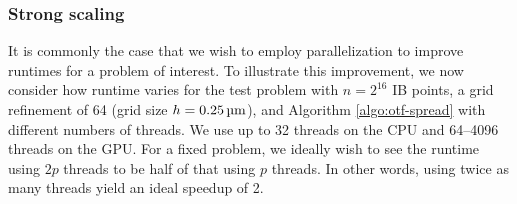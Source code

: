 \subsubsection{Strong scaling} \label{sec:unst-strong}

It is commonly the case that we wish to employ parallelization to improve runtimes for a
problem of interest. To illustrate this improvement, we now consider how runtime varies
for the test problem with $n=2^{16}$ IB points, a grid refinement of 64 (grid size
$h=0.25\um$), and Algorithm \ref{algo:otf-spread} with different numbers of threads. We
use up to 32 threads on the CPU and 64--4096 threads on the GPU. For a fixed problem, we
ideally wish to see the runtime using $2p$ threads to be half of that using $p$ threads.
In other words, using twice as many threads yield an ideal speedup of 2.


